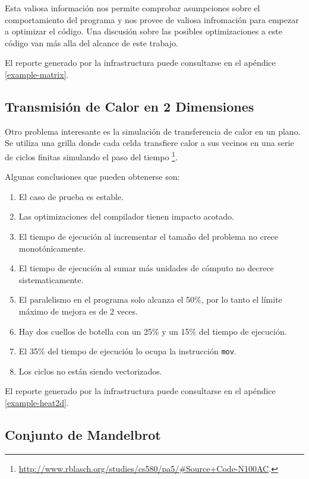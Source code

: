 \documentclass[a4paper]{report}
\begin{document}
Esta valiosa información nos permite comprobar asumpciones sobre el comportamiento del programa y nos provee de valiosa infromación para empezar a optimizar el código. Una discusión sobre las posibles optimizaciones a este código van más alla del alcance de este trabajo.

\bigskip

El reporte generado por la infrastructura puede consultarse en el apéndice \ref{example-matrix}.

\subsection{Transmisión de Calor en 2 Dimensiones}

Otro problema interesante es la simulación de transferencia de calor en un plano.
Se utiliza una grilla donde cada celda transfiere calor a sus vecinos en una serie de ciclos finitas simulando el paso del tiempo \footnote{\href{http://www.rblasch.org/studies/cs580/pa5/\#Source+Code-N100AC}{http://www.rblasch.org/studies/cs580/pa5/\#Source+Code-N100AC}.}.

\bigskip

Algunas conclusiones que pueden obtenerse son:

\begin{enumerate}
\item El caso de prueba es estable.
\item Las optimizaciones del compilador tienen impacto acotado.
\item El tiempo de ejecución al incrementar el tamaño del problema no crece monotónicamente.
\item El tiempo de ejecución al sumar más unidades de cómputo no decrece sistematicamente.
\item El paralelismo en el programa solo alcanza el 50\%, por lo tanto el límite máximo de mejora es de 2 veces.
\item Hay dos cuellos de botella con un 25\% y un 15\% del tiempo de ejecución.
\item El 35\% del tiempo de ejecución lo ocupa la instrucción {\tt mov}.
\item Los ciclos no están siendo vectorizados.
\end{enumerate}

El reporte generado por la infrastructura puede consultarse en el apéndice \ref{example-heat2d}.

\subsection{Conjunto de Mandelbrot}
\end{document}

